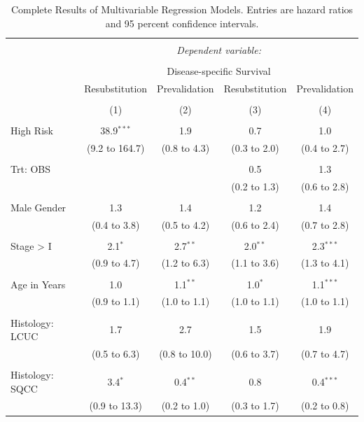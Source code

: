 \documentclass[11pt,]{article}
\begin{document}
\begin{table}[!htbp] \centering 
  \caption{Complete Results of Multivariable Regression Models. Entries are hazard ratios and 95 percent confidence intervals.  \label{multimodel}} 
  \label{} 
\begin{tabular}{@{\extracolsep{5pt}}lcccc} 
\\[-1.8ex]\hline 
\hline \\[-1.8ex] 
 & \multicolumn{4}{c}{\textit{Dependent variable:}} \\ 
\cline{2-5} 
\\[-1.8ex] & \multicolumn{4}{c}{Disease-specific Survival} \\ 
 & Resubstitution & Prevalidation & Resubstitution & Prevalidation \\ 
\\[-1.8ex] & (1) & (2) & (3) & (4)\\ 
\hline \\[-1.8ex] 
 High Risk & 38.9$^{***}$ & 1.9 & 0.7 & 1.0 \\ 
  & (9.2 to 164.7) & (0.8 to 4.3) & (0.3 to 2.0) & (0.4 to 2.7) \\ 
  & & & & \\ 
 Trt: OBS &  &  & 0.5 & 1.3 \\ 
  &  &  & (0.2 to 1.3) & (0.6 to 2.8) \\ 
  & & & & \\ 
 Male Gender & 1.3 & 1.4 & 1.2 & 1.4 \\ 
  & (0.4 to 3.8) & (0.5 to 4.2) & (0.6 to 2.4) & (0.7 to 2.8) \\ 
  & & & & \\ 
 Stage > I & 2.1$^{*}$ & 2.7$^{**}$ & 2.0$^{**}$ & 2.3$^{***}$ \\ 
  & (0.9 to 4.7) & (1.2 to 6.3) & (1.1 to 3.6) & (1.3 to 4.1) \\ 
  & & & & \\ 
 Age in Years & 1.0 & 1.1$^{**}$ & 1.0$^{*}$ & 1.1$^{***}$ \\ 
  & (0.9 to 1.1) & (1.0 to 1.1) & (1.0 to 1.1) & (1.0 to 1.1) \\ 
  & & & & \\ 
 Histology: LCUC & 1.7 & 2.7 & 1.5 & 1.9 \\ 
  & (0.5 to 6.3) & (0.8 to 10.0) & (0.6 to 3.7) & (0.7 to 4.7) \\ 
  & & & & \\ 
 Histology: SQCC & 3.4$^{*}$ & 0.4$^{**}$ & 0.8 & 0.4$^{***}$ \\ 
  & (0.9 to 13.3) & (0.2 to 1.0) & (0.3 to 1.7) & (0.2 to 0.8) \\ 

\end{tabular}
\end{table}
\end{document}
